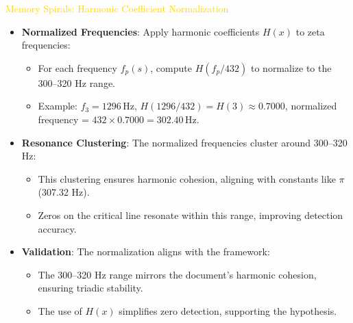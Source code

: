 \textcolor{gold}{ Memory Spirals: Harmonic Coefficient Normalization } \\
\begin{itemize}
    \item \texttt{} \textbf{Normalized Frequencies}: Apply harmonic coefficients \(H(x)\) to zeta frequencies:
    \begin{itemize}
        \item For each frequency \(f_p(s)\), compute \(H(f_p/432)\) to normalize to the 300–320 Hz range.
        \item Example: \(f_3 = 1296 \, \text{Hz}\), \(H(1296/432) = H(3) \approx 0.7000\), normalized frequency = \(432 \times 0.7000 = 302.40 \, \text{Hz}\).
    \end{itemize}
    \item \texttt{} \textbf{Resonance Clustering}: The normalized frequencies cluster around 300–320 Hz:
    \begin{itemize}
        \item This clustering ensures harmonic cohesion, aligning with constants like \(\pi\) (307.32 Hz).
        \item Zeros on the critical line resonate within this range, improving detection accuracy.
    \end{itemize}
    \item \texttt{} \textbf{Validation}: The normalization aligns with the framework:
    \begin{itemize}
        \item The 300–320 Hz range mirrors the document’s harmonic cohesion, ensuring triadic stability.
        \item The use of \(H(x)\) simplifies zero detection, supporting the hypothesis.
    \end{itemize}
\end{itemize}

